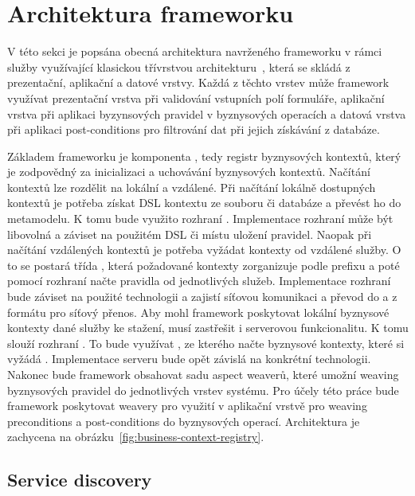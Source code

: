 \section{Architektura frameworku}\label{sec:architecture}

V této sekci je popsána obecná architektura navrženého frameworku v rámci služby využívající
klasickou třívrstvou architekturu~\cite{fowler2002patterns}, která se skládá z prezentační,
aplikační a datové vrstvy. Každá z těchto vrstev může framework využívat
\textendash\xspace prezentační vrstva při validování vstupních polí formuláře, aplikační vrstva při
aplikaci byzynsových pravidel v byznysových operacích a datová vrstva při aplikaci post-conditions pro
filtrování dat při jejich získávání z databáze.

Základem frameworku je komponenta , tedy registr
byznysových kontextů, který je zodpovědný za inicializaci a uchovávání byznysových kontextů.
Načítání kontextů lze rozdělit na lokální a vzdálené. Při načítání lokálně dostupných kontextů
je potřeba získat \gls{DSL} kontextu ze souboru či databáze a převést ho do metamodelu.
K tomu bude využito rozhraní . Implementace rozhraní může být libovolná
a záviset na použitém \gls{DSL} či místu uložení pravidel. Naopak při načítání vzdálených
kontextů je potřeba vyžádat kontexty od vzdálené služby. O to se postará třída ,
která požadované kontexty zorganizuje podle prefixu a poté pomocí rozhraní  načte
pravidla od jednotlivých služeb. Implementace rozhraní  bude záviset na použité
technologii a zajistí síťovou komunikaci a převod do a z formátu pro síťový přenos.
Aby mohl framework poskytovat lokální byznysové kontexty dané služby ke stažení, musí zastřešit
i serverovou funkcionalitu. K tomu slouží rozhraní . To bude využívat
, ze kterého načte byznysové kontexty, které si vyžádá .
Implementace serveru bude opět závislá na konkrétní technologii.
Nakonec bude framework obsahovat sadu aspect weaverů, které umožní weaving byznysových pravidel do
jednotlivých vrstev systému. Pro účely této práce bude framework poskytovat weavery pro využití v
aplikační vrstvě pro weaving preconditions a post-conditions do byznysových operací.
Architektura je zachycena na obrázku~\ref{fig:business-context-registry}.

\subsection{Service discovery}

